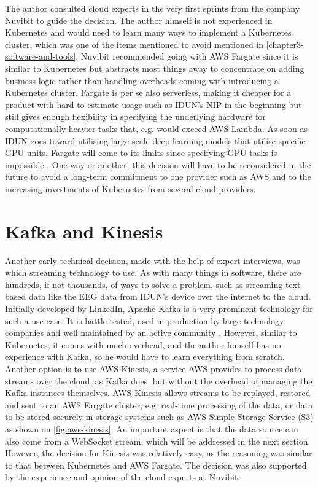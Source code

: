 The author consulted cloud experts in the very first sprints from the company Nuvibit to guide the decision. The author himself is not experienced in Kubernetes and would need to learn many ways to implement a Kubernetes cluster, which was one of the items mentioned to avoid mentioned in \autoref{chapter3-software-and-tools}. Nuvibit recommended going with AWS Fargate since it is similar to Kubernetes but abstracts most things away to concentrate on adding business logic rather than handling overheads coming with introducing a Kubernetes cluster. Fargate is per se also serverless, making it cheaper for a product with hard-to-estimate usage such as IDUN's NIP in the beginning but still gives enough flexibility in specifying the underlying hardware for computationally heavier tasks that, e.g. would exceed AWS Lambda. As soon as IDUN goes toward utilising large-scale deep learning models that utilise specific GPU units, Fargate will come to its limits since specifying GPU tasks is impossible \citep{amazon_web_services_inc_aws_2019}. One way or another, this decision will have to be reconsidered in the future to avoid a long-term commitment to one provider such as AWS and to the increasing investments of Kubernetes from several cloud providers.

\section*{Kafka and Kinesis}
\label{chapter4-kafka-aws-kinesis}

Another early technical decision, made with the help of expert interviews, was which streaming technology to use. As with many things in software, there are hundreds, if not thousands, of ways to solve a problem, such as streaming text-based data like the EEG data from IDUN's device over the internet to the cloud. Initially developed by LinkedIn, Apache Kafka is a very prominent technology for such a use case. It is battle-tested, used in production by large technology companies \citep{apache_apache_nodate} and well maintained by an active community \citep{noauthor_apache_2022}. However, similar to Kubernetes, it comes with much overhead, and the author himself has no experience with Kafka, so he would have to learn everything from scratch. Another option is to use AWS Kinesis, a service AWS provides to process data streams over the cloud, as Kafka does, but without the overhead of managing the Kafka instances themselves. AWS Kinesis allows streams to be replayed, restored and sent to an AWS Fargate cluster, e.g. real-time processing of the data, or data to be stored securely in storage systems such as AWS Simple Storage Service (S3) as shown on \autoref{fig:aws-kinesis}. An important aspect is that the data source can also come from a WebSocket stream, which will be addressed in the next section. However, the decision for Kinesis was relatively easy, as the reasoning was similar to that between Kubernetes and AWS Fargate. The decision was also supported by the experience and opinion of the cloud experts at Nuvibit.

